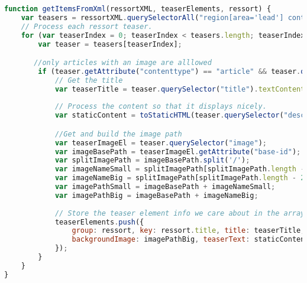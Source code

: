 \begin{lstlisting}[language= Javascript,caption=Parsen und Speichern der Daten., label={lst:xmlparsing}]
function getItemsFromXml(ressortXML, teaserElements, ressort) {
    var teasers = ressortXML.querySelectorAll("region[area='lead'] container > block:first-child");
    // Process each ressort teaser.
    for (var teaserIndex = 0; teaserIndex < teasers.length; teaserIndex++) {
        var teaser = teasers[teaserIndex];

       //only articles with an image are alllowed
        if (teaser.getAttribute("contenttype") == "article" && teaser.querySelector("image") !== null) {
            // Get the title
            var teaserTitle = teaser.querySelector("title").textContent;
        
            // Process the content so that it displays nicely.
            var staticContent = toStaticHTML(teaser.querySelector("description").textContent);

            //Get and build the image path
            var teaserImageEl = teaser.querySelector("image");
            var imageBasePath = teaserImageEl.getAttribute("base-id");
            var splitImagePath = imageBasePath.split('/');
            var imageNameSmall = splitImagePath[splitImagePath.length - 2] + "-220x124.jpg";
            var imageNameBig = splitImagePath[splitImagePath.length - 2] + "-540x304.jpg";
            var imagePathSmall = imageBasePath + imageNameSmall;
            var imagePathBig = imageBasePath + imageNameBig;
            
            // Store the teaser element info we care about in the array.
            teaserElements.push({
                group: ressort, key: ressort.title, title: teaserTitle,
                backgroundImage: imagePathBig, teaserText: staticContent
            });
        }
    }
}
\end{lstlisting} 